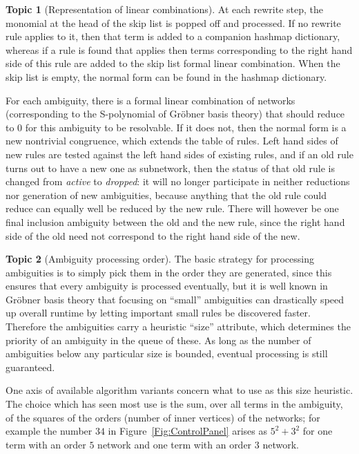 \documentclass{article}
\theoremstyle{definition}
\newtheorem{topic}{Topic}
\begin{document}
\begin{topic}[Representation of linear combinations]
  At each rewrite step, the monomial at the head of the skip list is 
  popped off and processed. If no rewrite rule applies to it, then 
  that term is added to a companion hashmap dictionary, whereas if a 
  rule is found that applies then terms corresponding to the right 
  hand side of this rule are added to the skip list formal linear 
  combination. When the skip list is empty, the normal form can be 
  found in the hashmap dictionary.
\end{topic}

For each ambiguity, there is a formal linear combination of networks 
(corresponding to the S-polynomial of Gr\"obner basis theory) that 
should reduce to $0$ for this ambiguity to be resolvable. If it does 
not, then the normal form is a new nontrivial congruence, which 
extends the table of rules. Left hand sides of new rules are tested 
against the left hand sides of existing rules, and if an old rule 
turns out to have a new one as subnetwork, then the status of that 
old rule is changed from \emph{active} to \emph{dropped}: it will no 
longer participate in neither reductions nor generation of new 
ambiguities, because anything that the old rule could reduce can 
equally well be reduced by the new rule. There will however be one 
final inclusion ambiguity between the old and the new rule, since the 
right hand side of the old need not correspond to the right hand side 
of the new.

\begin{topic}[Ambiguity processing order]
  The basic strategy for processing ambiguities is to simply pick 
  them in the order they are generated, since this ensures that every 
  ambiguity is processed eventually, but it is well known in 
  Gr\"obner basis theory that focusing on ``small'' ambiguities can 
  drastically speed up overall runtime by letting important small 
  rules be discovered faster. Therefore the ambiguities carry a 
  heuristic ``size'' attribute, which determines the priority of an 
  ambiguity in the queue of these. As long as the number of 
  ambiguities below any particular size is bounded, eventual 
  processing is still guaranteed.
  
  One axis of available algorithm variants concern what to use as 
  this size heuristic. The choice which has seen most use is the sum, 
  over all terms in the ambiguity, of the squares of the orders 
  (number of inner vertices) of the networks; for example the number 
  $34$ in Figure~\ref{Fig:ControlPanel} arises as $5^2 + 3^2$ for one 
  term with an order $5$ network and one term with an order $3$ 
  network.
\end{topic}
\end{document}

